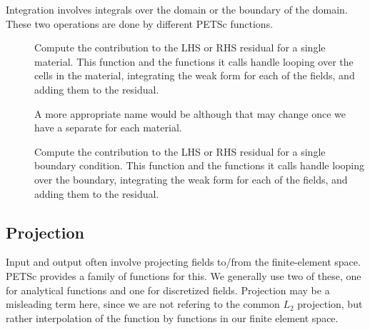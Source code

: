 Integration involves integrals over the domain or the boundary of the
domain. These two operations are done by different PETSc functions.

\begin{description}
\item[] Compute the
  contribution to the LHS or RHS residual for a single material. This
  function and the functions it calls handle looping over the cells in
  the material, integrating the weak form for each of the fields, and
  adding them to the residual.

  A more appropriate name would be
   although that may change once
  we have a separate  for each material.
%
\item[] Compute the contribution
  to the LHS or RHS residual for a single boundary condition. This
  function and the functions it calls handle looping over the
  boundary, integrating the weak form for each of the fields, and
  adding them to the residual.
\end{description}

\subsection{Projection}

Input and output often involve projecting fields to/from the
finite-element space. PETSc provides a family of functions for
this. We generally use two of these, one for analytical functions and
one for discretized fields. Projection may be a misleading term here,
since we are not refering to the common $L_2$ projection, but rather
interpolation of the function by functions in our finite element
space.

